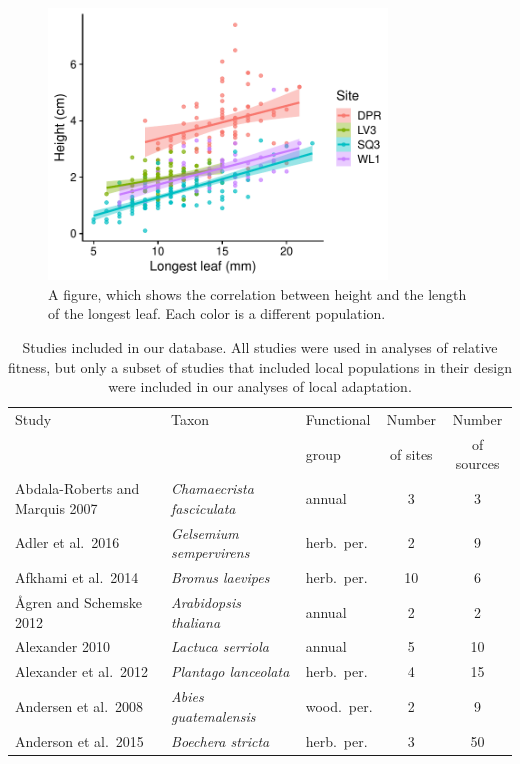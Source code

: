 \documentclass[11pt]{article}
\begin{document}
\begin{figure}
\centering
  \includegraphics[width=9cm]{../plots/height_leaf.pdf}
  \caption{A figure, which shows the correlation between height and the length of the longest leaf. Each color is a different population.}
  \label{height_leaf}
\end{figure}


\clearpage

\begin{table}
\scriptsize
\caption{Studies included in our database. All studies were used in analyses of relative fitness, but only a subset of studies that included local populations in their design were included in our analyses of local adaptation. }
\begin{tabular}{lllcc}
\toprule
Study & Taxon   & Functional & Number    & Number      \\
      &         & group      & of sites  & of sources  \\
\midrule
Abdala-Roberts and Marquis 2007     & \textit{Chamaecrista fasciculata} & annual &  3 &   3  \\
Adler et al.\ 2016                      & \textit{Gelsemium sempervirens} & herb.\ per. &  2 &   9   \\
Afkhami et al.\ 2014                 & \textit{Bromus laevipes} & herb.\ per. & 10 &   6  \\
\r{A}gren and Schemske 2012         & \textit{Arabidopsis thaliana} & annual &  2 &   2  \\
Alexander 2010                & \textit{Lactuca serriola} & annual &  5 &  10   \\
Alexander et al.\ 2012                  & \textit{Plantago lanceolata} & herb.\ per. &  4 &  15  \\
Andersen et al.\ 2008         & \textit{Abies guatemalensis} & wood.\ per. &  2 &   9  \\
Anderson et al.\ 2015                 & \textit{Boechera stricta} & herb.\ per. &  3 &  50  \\
\bottomrule
\end{tabular}
\label{studies_table}
\end{table}





\end{document}
